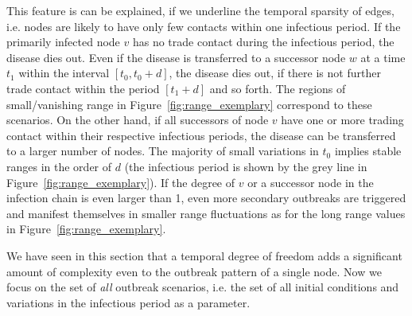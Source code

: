 This feature is can be explained, if we underline the temporal sparsity of edges, i.e. nodes are likely to have only few contacts within one infectious period.
If the primarily infected node $v$ has no trade contact during the infectious period, the disease dies out.
Even if the disease is transferred to a successor node $w$ at a time $t_1$ within the interval $[t_0,t_0+d]$, the disease dies out, if there is not further trade contact within the period $[t_1+d]$ and so forth.
The regions of small/vanishing range in Figure~\ref{fig:range_exemplary} correspond to these scenarios.
On the other hand, if all successors of node $v$ have one or more trading contact within their respective infectious periods, the disease can be transferred to a larger number of nodes.
The majority of small variations in $t_0$ implies stable ranges in the order of $d$ (the infectious period is shown by the grey line in Figure~\ref{fig:range_exemplary}).
If the degree of $v$ or a successor node in the infection chain is even larger than 1, even more secondary outbreaks are triggered and manifest themselves in smaller range fluctuations as for the long range values in Figure~\ref{fig:range_exemplary}.

We have seen in this section that a temporal degree of freedom adds a significant amount of complexity even to the outbreak pattern of a single node.
Now we focus on the set of \emph{all} outbreak scenarios, i.e. the set of all initial conditions and variations in the infectious period as a parameter.
%
